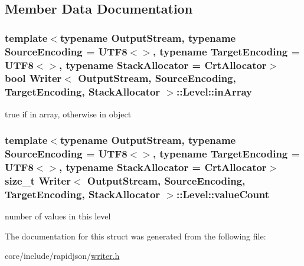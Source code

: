 \subsection{Member Data Documentation}
\subsubsection[{\texorpdfstring{in\+Array}{inArray}}]{\setlength{\rightskip}{0pt plus 5cm}template$<$typename Output\+Stream, typename Source\+Encoding = U\+T\+F8$<$$>$, typename Target\+Encoding = U\+T\+F8$<$$>$, typename Stack\+Allocator = Crt\+Allocator$>$ bool {\bf Writer}$<$ Output\+Stream, Source\+Encoding, Target\+Encoding, Stack\+Allocator $>$\+::Level\+::in\+Array}\hypertarget{structWriter_1_1Level_aa188a24842bcadebcd037ab852b978bb}{}\label{structWriter_1_1Level_aa188a24842bcadebcd037ab852b978bb}


true if in array, otherwise in object 

\subsubsection[{\texorpdfstring{value\+Count}{valueCount}}]{\setlength{\rightskip}{0pt plus 5cm}template$<$typename Output\+Stream, typename Source\+Encoding = U\+T\+F8$<$$>$, typename Target\+Encoding = U\+T\+F8$<$$>$, typename Stack\+Allocator = Crt\+Allocator$>$ size\+\_\+t {\bf Writer}$<$ Output\+Stream, Source\+Encoding, Target\+Encoding, Stack\+Allocator $>$\+::Level\+::value\+Count}\hypertarget{structWriter_1_1Level_a01214721e4001d997f3057d26edba9a0}{}\label{structWriter_1_1Level_a01214721e4001d997f3057d26edba9a0}


number of values in this level 



The documentation for this struct was generated from the following file\+:\begin{DoxyCompactItemize}
\item 
core/include/rapidjson/\hyperlink{writer_8h}{writer.\+h}\end{DoxyCompactItemize}

